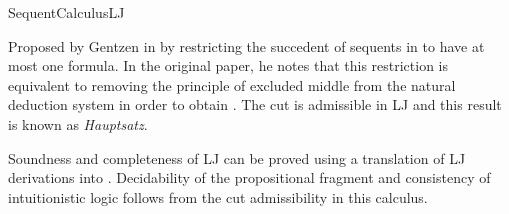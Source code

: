 \begin{entry}{SequentCalculusLJ}
\begin{history}
Proposed by Gentzen in \cite{Gentzen1935} by restricting the
succedent of sequents in  to have at most one
formula. In the original paper, he notes that this restriction is equivalent to
removing the principle of excluded middle from the natural deduction system
 in order to obtain .
The cut is admissible in LJ and this result is known as \emph{Hauptsatz}.
\end{history}

\begin{technicalities}
Soundness and completeness of LJ can be proved using a translation of LJ
derivations into .
Decidability of the propositional fragment and consistency of intuitionistic
logic follows from the cut admissibility in this calculus.
\end{technicalities}







\end{entry}
